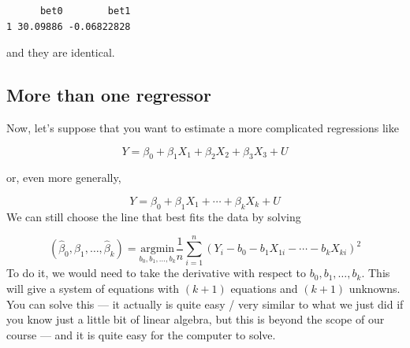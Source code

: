 \documentclass[
  letterpaper,
  DIV=11,
  numbers=noendperiod]{scrreprt}
\newenvironment{Shaded}{\begin{snugshade}}{\end{snugshade}}
\newcommand{\AttributeTok}[1]{\textcolor[rgb]{0.40,0.45,0.13}{#1}}
\newcommand{\CommentTok}[1]{\textcolor[rgb]{0.37,0.37,0.37}{#1}}
\newcommand{\FunctionTok}[1]{\textcolor[rgb]{0.28,0.35,0.67}{#1}}
\newcommand{\NormalTok}[1]{\textcolor[rgb]{0.00,0.23,0.31}{#1}}
\newcommand{\OtherTok}[1]{\textcolor[rgb]{0.00,0.23,0.31}{#1}}
\newcommand{\SpecialCharTok}[1]{\textcolor[rgb]{0.37,0.37,0.37}{#1}}
\begin{document}
\begin{Shaded}
\end{Shaded}

\begin{verbatim}
      bet0        bet1
1 30.09886 -0.06822828
\end{verbatim}

and they are identical.

\subsection{More than one regressor}\label{more-than-one-regressor}

Now, let's suppose that you want to estimate a more complicated
regressions like

\[
  Y = \beta_0 + \beta_1 X_1 + \beta_2 X_2 + \beta_3 X_3 + U
\]

or, even more generally,

\[
  Y = \beta_0 + \beta_1 X_1 + \cdots + \beta_k X_k + U
\] We can still choose the line that best fits the data by solving

\[
  (\hat{\beta}_0, \hat{\beta}_1, \ldots, \hat{\beta}_k) = \underset{b_0,b_1,\ldots,b_k}{\textrm{argmin}} \frac{1}{n} \sum_{i=1}^n (Y_i - b_0 - b_1 X_{1i} - \cdots - b_k X_{ki})^2
\] To do it, we would need to take the derivative with respect to
\(b_0, b_1, \ldots, b_k\). This will give a system of equations with
\((k+1)\) equations and \((k+1)\) unknowns. You can solve this --- it
actually is quite easy / very similar to what we just did if you know
just a little bit of linear algebra, but this is beyond the scope of our
course --- and it is quite easy for the computer to solve.
\end{document}
